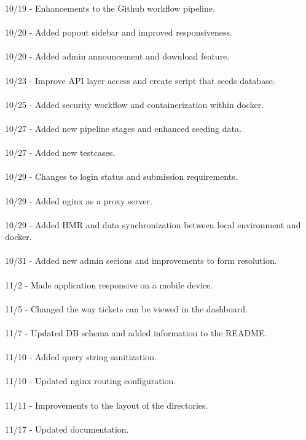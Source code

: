 \documentclass[oneside,openany,obeyspaces]{book}
\begin{document}
\begin{flushleft}
    10/19 - Enhancements to the Github workflow pipeline.\\~\\
    10/20 - Added popout sidebar and improved responsiveness.\\~\\
    10/20 - Added admin announcement and download feature.\\~\\
    10/23 - Improve API layer access and create script that seeds database.\\~\\
    10/25 - Added security workflow and containerization within docker.\\~\\
    10/27 - Added new pipeline stages and enhanced seeding data.\\~\\
    10/27 - Added new testcases.\\~\\
    10/29 - Changes to login status and submission requirements.\\~\\
    10/29 - Added nginx as a proxy server.\\~\\
    10/29 - Added HMR and data synchronization between local environment and docker.\\~\\
    10/31 - Added new admin secions and improvements to form resolution.\\~\\
    11/2 - Made application responsive on a mobile device.\\~\\
    11/5 - Changed the way tickets can be viewed in the dashboard.\\~\\
    11/7 - Updated DB schema and added information to the README.\\~\\
    11/10 - Added query string sanitization.\\~\\
    11/10 - Updated nginx routing configuration.\\~\\
    11/11 - Improvements to the layout of the directories.\\~\\
    11/17 - Updated documentation.\\~\\

\end{flushleft}
\end{document}
